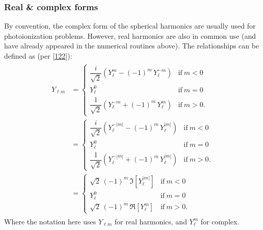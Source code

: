 \documentclass[letterpaper,table,10pt,english]{jupyterBook}
\begin{document}
\subsubsection{Real \& complex forms}
\label{\detokenize{part1/theory_observables_intro_100723:real-complex-forms}}
\sphinxAtStartPar
By convention, the complex form of the spherical harmonics are usually used for photoionization problems. However, real harmonics are also in common use (and have already appeared in the numerical routines above). The relationships can be defined as (per  {[}\hyperlink{cite.backmatter/bibliography:id961}{122}{]}):
\begin{equation}\label{equation:part1/theory_observables_intro_100723:eq:re-complex-YLM}
\begin{split}
\begin{aligned}
Y_{\ell m}&={\begin{cases}{\dfrac {i}{\sqrt {2}}}\left(Y_{\ell }^{m}-(-1)^{m}\,Y_{\ell }^{-m}\right)&{\text{if}}\ m\lt0
\\Y_{\ell }^{0}&{\text{if}}\ m=0
\\{\dfrac {1}{\sqrt {2}}}\left(Y_{\ell }^{-m}+(-1)^{m}\,Y_{\ell }^{m}\right)&{\text{if}}\ m\gt0.\end{cases}}
\\&={\begin{cases}{\dfrac {i}{\sqrt {2}}}\left(Y_{\ell }^{-|m|}-(-1)^{m}\,Y_{\ell }^{|m|}\right)&{\text{if}}\ m\lt0
\\Y_{\ell }^{0}&{\text{if}}\ m=0
\\{\dfrac {1}{\sqrt {2}}}\left(Y_{\ell }^{-|m|}+(-1)^{m}\,Y_{\ell }^{|m|}\right)&{\text{if}}\ m\gt0.\end{cases}}
\\&={\begin{cases}{\sqrt {2}}\,(-1)^{m}\,\Im [{Y_{\ell }^{|m|}}]&{\text{if}}\ m\lt0
\\Y_{\ell }^{0}&{\text{if}}\ m=0
\\{\sqrt {2}}\,(-1)^{m}\,\Re [{Y_{\ell }^{m}}]&{\text{if}}\ m\gt0.\end{cases}}
\end{aligned}
\end{split}
\end{equation}
\sphinxAtStartPar
Where the notation here uses \(Y_{\ell m}\) for real harmonics, and \(Y_{\ell }^{m}\) for complex.
\end{document}
